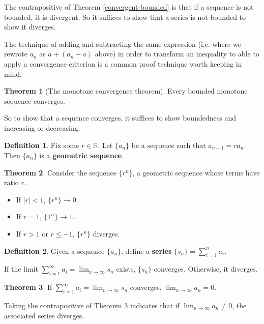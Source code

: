 \documentclass{article}
\theoremstyle{definition}
\newtheorem{definition}{Definition}[section]
\newtheorem{theorem}{Theorem}[section]
\begin{document}
The contrapositive of Theorem \ref{convergent-bounded} is that if a sequence is not bounded, it is divergent. So it suffices to show that a series is not bounded to show it diverges.

The technique of adding and subtracting the same expression (i.e. where we rewrote $a_n$ as $a + (a_n - a)$ above) in order to transform an inequality to able to apply a convergence criterion is a common proof technique worth keeping in mind.

\begin{theorem}[The monotone convergence theorem]
Every bounded monotone sequence converges.
\end{theorem}

So to show that a sequence converges, it suffices to show boundedness and increasing or decreasing.

\begin{definition}
Fix some $r \in \mathbb{R}$. Let $\{a_n\}$ be a sequence such that $a_{n+1} = ra_n$. Then $\{a_n\}$ is a \textbf{geometric sequence}.
\end{definition}

\begin{theorem}
Consider the sequence $\{r^n\}$, a geometric sequence whose terms have ratio $r$. 

\begin{itemize}
\item If $|r| < 1$, $\{r^n\} \to 0$.
\item If $r = 1$, $\{1^n\} \to 1$.
\item If $r > 1$ or $r \leq -1$, $\{r^n\}$ diverges.
\end{itemize}

\end{theorem}

\begin{definition}
Given a sequence $\{a_n\}$, define a \textbf{series} $\{s_n\} = \sum\limits_{i=1}^n a_i$.

If the limit $\sum\limits_{i=1}^\infty a_i = \lim_{n \to \infty} s_n$ exists, $\{s_n\}$ converges. Otherwise, it diverges.
\end{definition}

\begin{theorem} \label{convergent-series-sequence}
If $\sum\limits_{i=1}^\infty a_i = \lim_{n \to \infty} s_n$ converges, $\lim_{n \to \infty} a_n = 0$.
\end{theorem}

Taking the contrapositive of Theorem \ref{convergent-series-sequence} indicates that if $\lim_{n \to \infty} a_n \neq 0$, the associated series diverges.
\end{document}
